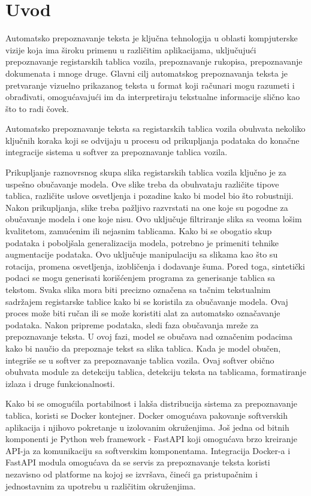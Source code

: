 \documentclass[a4paper,12pt]{article}
\begin{document}
	\section{Uvod}
	Automatsko prepoznavanje teksta je ključna tehnologija u oblasti kompjuterske vizije koja ima široku primenu u različitim aplikacijama, uključujući prepoznavanje registarskih tablica vozila, prepoznavanje rukopisa, prepoznavanje dokumenata i mnoge druge. Glavni cilj automatskog prepoznavanja teksta je pretvaranje vizuelno prikazanog teksta u format koji računari mogu razumeti i obrađivati, omogućavajući im da interpretiraju tekstualne informacije slično kao što to radi čovek.
		
	Automatsko prepoznavanje teksta sa registarskih tablica vozila obuhvata nekoliko ključnih koraka koji se odvijaju u procesu od prikupljanja podataka do konačne integracije sistema u softver za prepoznavanje tablica vozila.
	
	Prikupljanje raznovrsnog skupa slika registarskih tablica vozila ključno je za uspešno obučavanje modela. Ove slike treba da obuhvataju različite tipove tablica, različite uslove osvetljenja i pozadine kako bi model bio što robustniji. Nakon prikupljanja, slike treba pažljivo razvrstati na one koje su pogodne za obučavanje modela i one koje nisu. Ovo uključuje filtriranje slika sa veoma lošim kvalitetom, zamućenim ili nejasnim tablicama. Kako bi se obogatio skup podataka i poboljšala generalizacija modela, potrebno je primeniti tehnike augmentacije podataka. Ovo uključuje manipulaciju sa slikama kao što su rotacija, promena osvetljenja, izobličenja i dodavanje šuma. Pored toga, sintetički podaci se mogu generisati korišćenjem programa za generisanje tablica sa tekstom. Svaka slika mora biti precizno označena sa tačnim tekstualnim sadržajem registarske tablice kako bi se koristila za obučavanje modela. Ovaj proces može biti ručan ili se može koristiti alat za automatsko označavanje podataka. Nakon pripreme podataka, sledi faza obučavanja mreže za prepoznavanje teksta. U ovoj fazi, model se obučava nad označenim podacima kako bi naučio da prepoznaje tekst sa slika tablica. Kada je model obučen, integriše se u softver za prepoznavanje tablica vozila. Ovaj softver obično obuhvata module za detekciju tablica, detekciju teksta na tablicama, formatiranje izlaza i druge funkcionalnosti.
	
	Kako bi se omogućila portabilnost i lakša distribucija sistema za prepoznavanje tablica, koristi se Docker kontejner. Docker omogućava pakovanje softverskih aplikacija i njihovo pokretanje u izolovanim okruženjima. Još jedna od bitnih komponenti je Python web framework - FastAPI koji omogućava brzo kreiranje API-ja za komunikaciju sa softverskim komponentama. Integracija Docker-a i FastAPI modula omogućava da se servis za prepoznavanje teksta koristi nezavisno od platforme na kojoj se izvršava, čineći ga pristupačnim i jednostavnim za upotrebu u različitim okruženjima.
	\newpage
	
\end{document}
